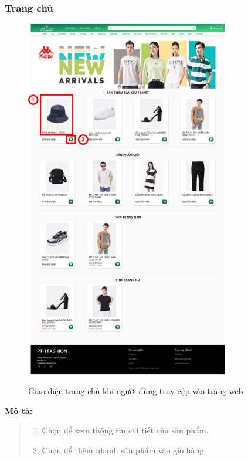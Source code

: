 \subsubsection{Trang chủ}
\begin{figure}[!htp]
    \centering
    \includegraphics[width=3.5in]{img/UI/new_customer/home.png}
    \label{8}
    \newline
    \caption{Giao diện trang chủ khi người dùng truy cập vào trang web}
\end{figure}
\textbf{Mô tả:}
\begin{quote}
    \begin{enumerate}
        \item Chọn để xem thông tin chi tiết của sản phẩm.
        \item Chọn để thêm nhanh sản phẩm vào giỏ hàng.
    \end{enumerate}
\end{quote}

